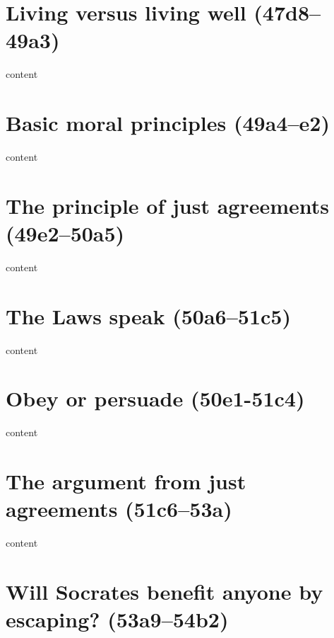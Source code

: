 \documentclass[11pt]{article}
\begin{document}
\section{Living versus living well (47d8--49a3)}

content

\section{Basic moral principles (49a4--e2)}

content

\section{The principle of just agreements (49e2--50a5)}

content

\section{The Laws speak (50a6--51c5)}

content

\section{Obey or persuade (50e1-51c4)}

content

\section{The argument from just agreements (51c6--53a)}

content

\section{Will Socrates benefit anyone by escaping? (53a9--54b2)}
\end{document}
